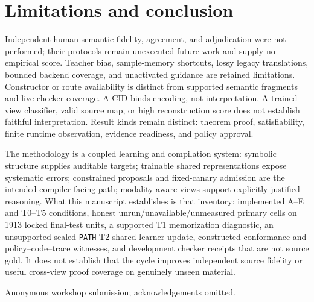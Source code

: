 \documentclass{article}
\begin{document}
\section{Limitations and conclusion}
Independent human semantic-fidelity, agreement, and adjudication were not performed; their protocols remain unexecuted future work and supply no empirical score. Teacher bias, sample-memory shortcuts, lossy legacy translations, bounded backend coverage, and unactivated guidance are retained limitations. Constructor or route availability is distinct from supported semantic fragments and live checker coverage. A CID binds encoding, not interpretation. A trained view classifier, valid source map, or high reconstruction score does not establish faithful interpretation. Result kinds remain distinct: theorem proof, satisfiability, finite runtime observation, evidence readiness, and policy approval.

The methodology is a coupled learning and compilation system: symbolic structure supplies auditable targets; trainable shared representations expose systematic errors; constrained proposals and fixed-canary admission are the intended compiler-facing path; modality-aware views support explicitly justified reasoning. What this manuscript establishes is that inventory: implemented A--E and T0--T5 conditions, honest unrun/unavailable/unmeasured primary cells on 1913 locked final-test units, a supported T1 memorization diagnostic, an unsupported sealed-\texttt{PATH} T2 shared-learner update, constructed conformance and policy--code--trace witnesses, and development checker receipts that are not source gold. It does not establish that the cycle improves independent source fidelity or useful cross-view proof coverage on genuinely unseen material.

\begin{ack}
Anonymous workshop submission; acknowledgements omitted.
\end{ack}




\appendix
\end{document}
